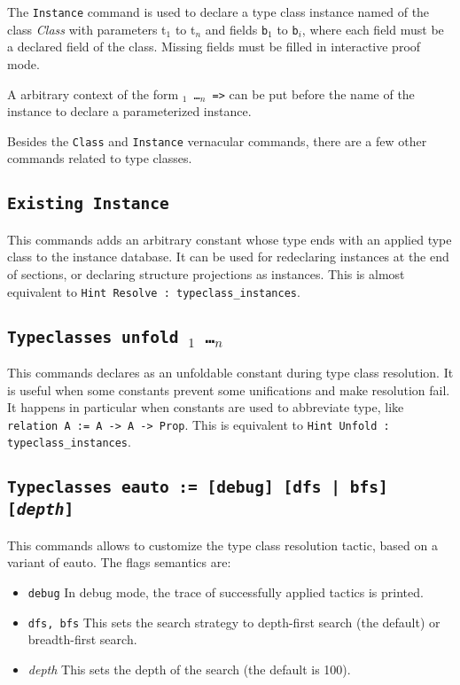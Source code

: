The \texttt{Instance} command is used to declare a type class instance
named {\ident} of the class \emph{Class} with parameters {t$_1$} to {t$_n$} and
fields {\tt b$_1$} to {\tt b$_i$}, where each field must be a declared
field of the class. Missing fields must be filled in interactive proof mode.

A arbitrary context of the form {\tt \binder$_1$ \ldots \binder$_n$ =>}
can be put before the name of the instance to declare a parameterized instance.

Besides the {\tt Class} and {\tt Instance} vernacular commands, there
are a few other commands related to type classes.

\subsection{\tt Existing Instance {\ident}}
\label{ExistingInstance}

This commands adds an arbitrary constant whose type ends with an applied
type class to the instance database. It can be used for redeclaring
instances at the end of sections, or declaring structure projections as
instances. This is almost equivalent to {\tt Hint Resolve {\ident} :
  typeclass\_instances}.

\subsection{\tt Typeclasses unfold {\ident$_1$ \ldots \ident$_n$}}
\label{TypeclassesUnfold}

This commands declares {\ident} as an unfoldable constant during type
class resolution. It is useful when some constants prevent some
unifications and make resolution fail. It happens in particular when constants are
used to abbreviate type, like {\tt relation A := A -> A -> Prop}.
This is equivalent to {\tt Hint Unfold {\ident} : typeclass\_instances}.

\subsection{\tt Typeclasses eauto := [debug] [dfs | bfs] [\emph{depth}]}
\label{TypeclassesEauto}

This commands allows to customize the type class resolution tactic,
based on a variant of eauto. The flags semantics are:
\begin{itemize}
\item {\tt debug} In debug mode, the trace of successfully applied
  tactics is printed.
\item {\tt dfs, bfs} This sets the search strategy to depth-first search
  (the default) or breadth-first search.
\item {\emph{depth}} This sets the depth of the search (the default is 100).
\end{itemize}

